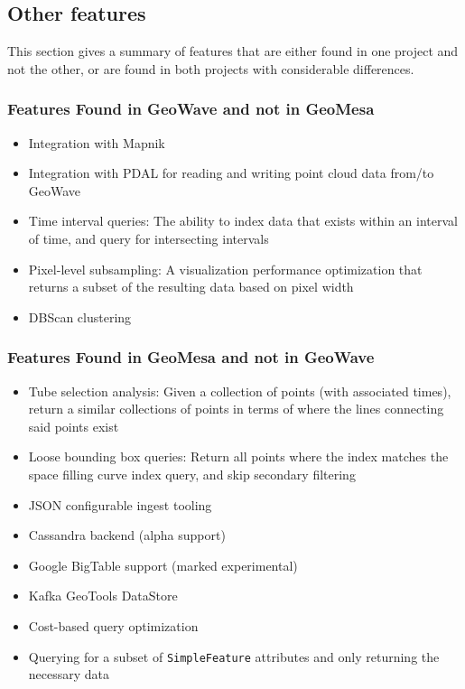\subsection{Other features}
\label{sec:featurecompare:other}

This section gives a summary of features that are either found in one project and not the other,
or are found in both projects with considerable differences.


\subsubsection{Features Found in GeoWave and not in GeoMesa}
\label{sec:featurecompare:other:wave}

\begin{itemize}
\item Integration with Mapnik
\item Integration with PDAL for reading and writing point cloud data from/to GeoWave
\item Time interval queries: The ability to index data that exists within an interval of time, and query for intersecting intervals
\item Pixel-level subsampling: A visualization performance optimization that returns a subset of the resulting data based on pixel width
\item DBScan clustering
\end{itemize}


\subsubsection{Features Found in GeoMesa and not in GeoWave}
\label{sec:featurecompare:other:mesa}

\begin{itemize}
\item Tube selection analysis: Given a collection of points (with associated times), return a similar collections of points in terms of where the lines connecting said points exist
\item Loose bounding box queries: Return all points where the index matches the space filling curve index query, and skip secondary filtering
\item JSON configurable ingest tooling
\item Cassandra backend (alpha support)
\item Google BigTable support (marked experimental)
\item Kafka GeoTools DataStore
\item Cost-based query optimization
\item Querying for a subset of \texttt{SimpleFeature} attributes and only returning the necessary data
\end{itemize}


